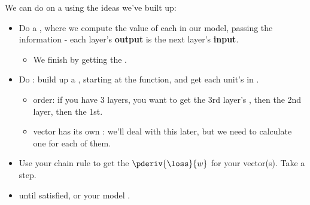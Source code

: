         \begin{concept}
            We can do  on a  using the ideas we've built up:
            
            \boxdiv
            
            \begin{itemize}
                \item Do a , where we compute the value of each  in our model, passing the information  - each layer's \textbf{output} is the next layer's \textbf{input}.
                    \begin{itemize}
                        \item We finish by getting the .
                    \end{itemize}
                    
            \boxdiv
                    
                \item Do : build up a , starting at the  function, and get each unit's  in .
                    \begin{itemize}
                        \item {} order: if you have 3 layers, you want to get the 3rd layer's , then the 2nd layer, then the 1st.
                        
                        \item {} vector has its own : we'll deal with this later, but we need to calculate one for each of them.
                    \end{itemize}
                    
            \boxdiv
                
                \item Use your chain rule to get the  $\pderiv{\loss}{w}$ for your  vector(s). Take a  step.
                
                \item {} until satisfied, or your model .
            \end{itemize}
        \end{concept}
        
    \secdiv
    

